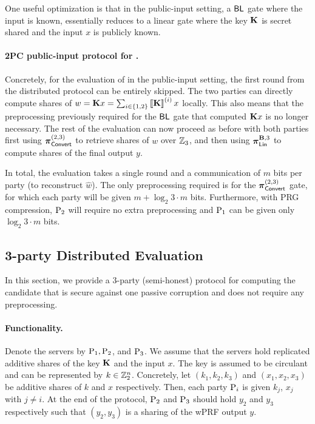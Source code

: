 One useful optimization is that in the public-input setting, a $\textnormal{\textsf{BL}}$ gate where the input is known, essentially reduces to a linear gate where the key $\mat{K}$ is secret shared and the input $x$ is publicly known.

\paragraph{2PC public-input protocol for \ttwPRF.}
Concretely, for the evaluation of \ttwPRF in the public-input setting, the first round from the distributed protocol can be entirely skipped. The two parties can directly compute shares of $w = \mat{K}x = \sum_{i \in \{1,2\}} \sharei{\mat{K}}x$ locally. This also means that the preprocessing previously required for the $\textnormal{\textsf{BL}}$ gate that computed $\mat{K}x$ is no longer necessary. The rest of the evaluation can now proceed as before with both parties first using $\boldsymbol{\pi}_{\textnormal{\textsf{Convert}}}^{(2,3)}$ to retrieve shares of $w$ over $\mathbb{Z}_3$, and then using $\prot_\LMap^{\mat{B},3}$ to compute shares of the final output $y$.

In total, the evaluation takes a single round and a communication of $m$ bits per party (to reconstruct $\hat{w}$). The only preprocessing required is for the $\boldsymbol{\pi}_{\textnormal{\textsf{Convert}}}^{(2,3)}$ gate, for which each party will be given $m + \log_2{3} \cdot m$ bits. Furthermore, with PRG compression, $\textnormal{P}_2$ will require no extra preprocessing and $\textnormal{P}_1$ can be given only $\log_2{3} \cdot m$ bits.



\subsection{3-party Distributed Evaluation}
\label{subsec:3party_protocol}

In this section, we provide a 3-party (semi-honest) protocol for computing the \ttwPRF candidate that is secure against one passive corruption and does not require any preprocessing.

\paragraph{Functionality.}
Denote the servers by $\textnormal{P}_1, \textnormal{P}_2$, and $\textnormal{P}_3$. We assume that the servers hold replicated additive shares of the key $\mat{K}$ and the input $x$. The key is assumed to be circulant and can be represented by $k \in \mathbb{Z}_2^n$. Concretely, let $(k_1, k_2, k_3)$ and $(x_1,x_2,x_3)$ be additive shares of $k$ and $x$ respectively. Then, each party $\textnormal{P}_i$ is given $k_j$, $x_j$ with $j \neq i$. At the end of the protocol, $\textnormal{P}_2$ and $\textnormal{P}_3$ should hold $y_2$ and $y_3$ respectively such that $(y_2, y_3)$ is a sharing of the wPRF output $y$.

